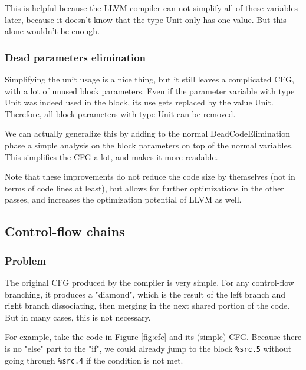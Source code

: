 \documentclass[11pt,a4paper]{article}
\newcommand{\scala}[1]{\textsf{#1}}
\newcommand{\nir}[1]{\texttt{#1}}
\begin{document}
This is helpful because the LLVM compiler can not simplify all of these variables later, because it doesn't know that the type \scala{Unit} only has one value. But this alone wouldn't be enough.

\subsubsection*{Dead parameters elimination}

Simplifying the unit usage is a nice thing, but it still leaves a complicated CFG, with a lot of unused block parameters. Even if the parameter variable with type \scala{Unit} was indeed used in the block, its use gets replaced by the value \scala{Unit}. Therefore, all block parameters with type \scala{Unit} can be removed.

We can actually generalize this by adding to the normal \scala{DeadCodeElimination} phase a simple analysis on the block parameters on top of the normal variables. This simplifies the CFG a lot, and makes it more readable.

Note that these improvements do not reduce the code size by themselves (not in terms of code lines at least), but allows for further optimizations in the other passes, and increases the optimization potential of LLVM as well.

\subsection{Control-flow chains}

\subsubsection*{Problem}

The original CFG produced by the compiler is very simple. For any control-flow branching, it produces a "diamond", which is the result of the left branch and right branch dissociating, then merging in the next shared portion of the code. But in many cases, this is not necessary.

For example, take the code in Figure \ref{fig:cfc} and its (simple) CFG. Because there is no "else" part to the "if", we could already jump to the block \nir{\%src.5} without going through \nir{\%src.4} if the condition is not met.
\end{document}
